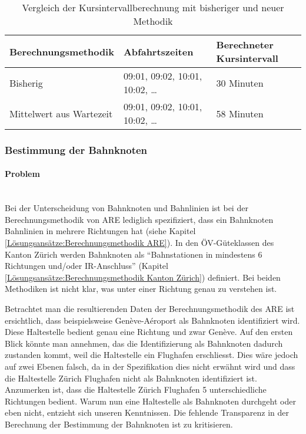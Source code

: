 \begin{table}[ht]
    \centering
    \begin{tabular}[c]{l l l}
        \toprule
        \textbf{Berechnungsmethodik}
                                    & \textbf{Abfahrtszeiten}
                                    & \textbf{Berechneter Kursintervall}\\
        \midrule
        Bisherig
                                    & 09:01, 09:02, 10:01, 10:02, \dots
                                    & 30 Minuten\\
        Mittelwert aus Wartezeit    & 09:01, 09:02, 10:01, 10:02, \dots
                                    & 58 Minuten\\
        \bottomrule
    \end{tabular}
    \caption{Vergleich der Kursintervallberechnung mit bisheriger und neuer Methodik}
    \label{table:Vergleich der Kursintervallberechnung mit bisheriger und neuer Methodik}
\end{table}

\subsubsection{Bestimmung der Bahnknoten}
\label{Verbesserungsmöglichkeiten:Bestimmung der Bahnknoten}

\paragraph{Problem}~\\
Bei der Unterscheidung von Bahnknoten und Bahnlinien ist bei der Berechnungsmethodik von \acs{ARE} lediglich spezifiziert, dass ein Bahnknoten Bahnlinien in mehrere Richtungen hat (siehe Kapitel \ref{Lösungsansätze:Berechnungsmethodik ARE}).
In den ÖV-Güteklassen des Kanton Zürich werden Bahnknoten als "`Bahnstationen in mindestens 6 Richtungen und/oder IR-Anschluss"' (Kapitel \ref{Lösungsansätze:Berechnungsmethodik Kanton Zürich}) definiert.
Bei beiden Methodiken ist nicht klar, was unter einer Richtung genau zu verstehen ist.

Betrachtet man die resultierenden Daten der Berechnungsmethodik des \acs{ARE} ist ersichtlich, dass beispielsweise Genève-Aéroport als Bahnknoten identifiziert wird.
Diese Haltestelle bedient genau eine Richtung und zwar Genève.
Auf den ersten Blick könnte man annehmen, das die Identifizierung als Bahnknoten dadurch zustanden kommt, weil die Haltestelle ein Flughafen erschliesst.
Dies wäre jedoch auf zwei Ebenen falsch, da in der Spezifikation dies nicht erwähnt wird und dass die Haltestelle Zürich Flughafen nicht als Bahnknoten identifiziert ist.
Anzumerken ist, dass die Haltestelle Zürich Flughafen 5 unterschiedliche Richtungen bedient.
Warum nun eine Haltestelle als Bahnknoten durchgeht oder eben nicht, entzieht sich unseren Kenntnissen.
Die fehlende Transparenz in der Berechnung der Bestimmung der Bahnknoten ist zu kritisieren.

